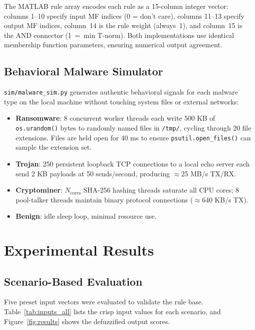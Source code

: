 \documentclass[conference]{IEEEtran}
\begin{document}
The MATLAB rule array encodes each rule as a 15-column integer vector:
columns 1--10 specify input MF indices (0 = don't care), columns 11--13
specify output MF indices, column~14 is the rule weight (always~1), and
column~15 is the AND connector (1~=~min T-norm). Both implementations use
identical membership function parameters, ensuring numerical output
agreement.

\subsection{Behavioral Malware Simulator}

\texttt{sim/malware\_sim.py} generates authentic behavioral signals for
each malware type on the local machine without touching system files or
external networks:

\begin{itemize}[leftmargin=2em]
  \item \textbf{Ransomware}: 8 concurrent worker threads each write
        500 KB of \texttt{os.urandom()} bytes to randomly named files
        in \texttt{/tmp/}, cycling through 20 file extensions. Files are
        held open for 40 ms to ensure \texttt{psutil.open\_files()} can
        sample the extension set.
  \item \textbf{Trojan}: 250 persistent loopback TCP connections to a
        local echo server each send 2 KB payloads at 50 sends/second,
        producing $\approx$25 MB/s TX/RX.
  \item \textbf{Cryptominer}: $N_{\text{cores}}$ SHA-256 hashing threads
        saturate all CPU cores; 8 pool-talker threads maintain binary
        protocol connections ($\approx$640 KB/s TX).
  \item \textbf{Benign}: idle sleep loop, minimal resource use.
\end{itemize}

\section{Experimental Results}

\subsection{Scenario-Based Evaluation}

Five preset input vectors were evaluated to validate the rule base.
Table~\ref{tab:inputs_all} lists the crisp input values for each
scenario, and Figure~\ref{fig:results} shows the defuzzified output
scores.
\end{document}
